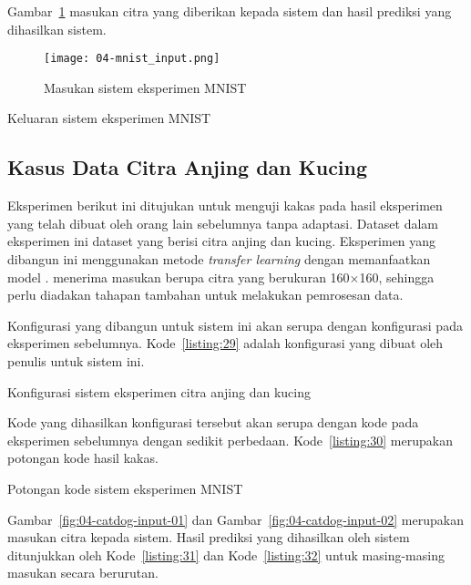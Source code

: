 Gambar~\ref{fig:04-mnist-input} masukan citra yang diberikan kepada sistem dan hasil prediksi yang dihasilkan sistem.

\begin{figure}[H]
    \centering
    \texttt{[image: 04-mnist\_input.png]}
    \caption{Masukan sistem eksperimen MNIST}\label{fig:04-mnist-input}
\end{figure}

\begin{code}
	\caption{Keluaran sistem eksperimen MNIST}\label{listing:28}
\end{code}

\subsection{Kasus Data Citra Anjing dan Kucing}

Eksperimen berikut ini ditujukan untuk menguji kakas pada hasil eksperimen yang telah dibuat oleh orang lain sebelumnya tanpa adaptasi.
Dataset dalam eksperimen ini dataset yang berisi citra anjing dan kucing.
Eksperimen yang dibangun ini menggunakan metode \textit{transfer learning} dengan memanfaatkan model .
 menerima masukan berupa citra yang berukuran 160\(\times\)160, sehingga perlu diadakan tahapan tambahan untuk melakukan pemrosesan data.

Konfigurasi yang dibangun untuk sistem ini akan serupa dengan konfigurasi pada eksperimen sebelumnya.
Kode~\ref{listing:29} adalah konfigurasi yang dibuat oleh penulis untuk sistem ini.

\begin{code}
	\caption{Konfigurasi sistem eksperimen citra anjing dan kucing}\label{listing:29}
\end{code}

Kode yang dihasilkan konfigurasi tersebut akan serupa dengan kode pada eksperimen sebelumnya dengan sedikit perbedaan.
Kode~\ref{listing:30} merupakan potongan kode hasil kakas.

\begin{code}
	\caption{Potongan kode sistem eksperimen MNIST}\label{listing:30}
\end{code}

Gambar~\ref{fig:04-catdog-input-01} dan Gambar~\ref{fig:04-catdog-input-02} merupakan masukan citra kepada sistem.
Hasil prediksi yang dihasilkan oleh sistem ditunjukkan oleh Kode~\ref{listing:31} dan Kode~\ref{listing:32} untuk masing-masing masukan secara berurutan.

